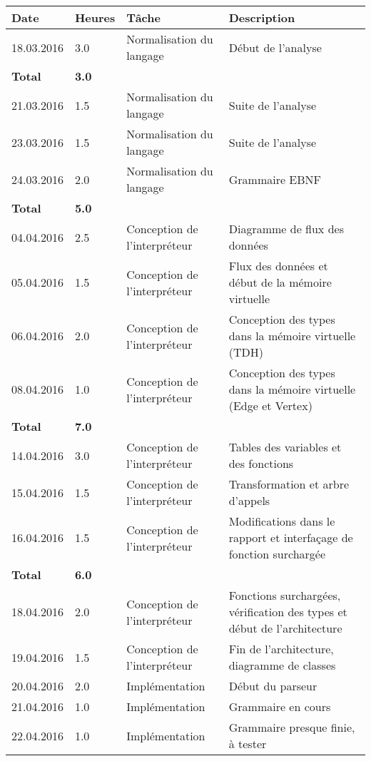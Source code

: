 \documentclass[french]{article}
\begin{document}
	\begin{longtable}{p{}|p{}|p{}|p{}}
		Date & Heures & Tâche & Description\\ 
		\hline \hline
		18.03.2016 & 3.0 & Normalisation du langage & Début de l'analyse\\ 
		\textbf{Total} & \textbf{3.0} &&\\
		\hline
		21.03.2016 & 1.5 & Normalisation du langage & Suite de l'analyse\\
		23.03.2016 & 1.5 & Normalisation du langage & Suite de l'analyse\\
		24.03.2016 & 2.0 & Normalisation du langage & Grammaire EBNF\\  
		\textbf{Total} & \textbf{5.0} &&\\
		\hline
		04.04.2016 & 2.5 & Conception de l'interpréteur & Diagramme de flux des données\\
		05.04.2016 & 1.5 & Conception de l'interpréteur & Flux des données et début de la mémoire virtuelle\\
		06.04.2016 & 2.0 & Conception de l'interpréteur & Conception des types dans la mémoire virtuelle (TDH)\\
		08.04.2016 & 1.0 & Conception de l'interpréteur & Conception des types dans la mémoire virtuelle (Edge et Vertex)\\   
		\textbf{Total} & \textbf{7.0} &&\\
		\hline
		14.04.2016 & 3.0 & Conception de l'interpréteur & Tables des variables et des fonctions\\
		15.04.2016 & 1.5 & Conception de l'interpréteur & Transformation et arbre d'appels\\
		16.04.2016 & 1.5 & Conception de l'interpréteur & Modifications dans le rapport et interfaçage de fonction surchargée\\   
		\textbf{Total} & \textbf{6.0} &&\\
		\hline
		18.04.2016 & 2.0 & Conception de l'interpréteur & Fonctions surchargées, vérification des types et début de l'architecture\\
		19.04.2016 & 1.5 & Conception de l'interpréteur & Fin de l'architecture, diagramme de classes\\ 
		20.04.2016 & 2.0 & Implémentation & Début du parseur\\
		21.04.2016 & 1.0 & Implémentation & Grammaire en cours\\
		22.04.2016 & 1.0 & Implémentation & Grammaire presque finie, à tester\\

\end{longtable}
\end{document}
